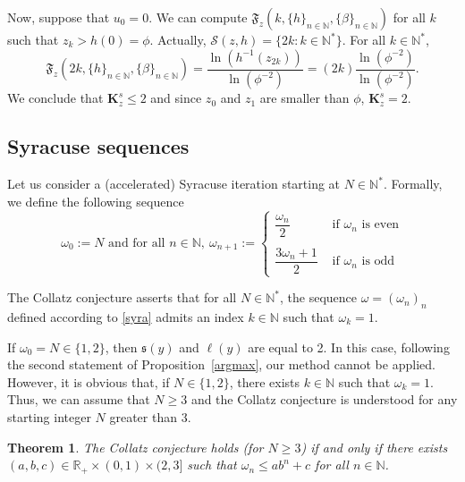 \documentclass{article}
\def\valu#1{\mathfrak{s}(#1)}
\def\ls#1{\boldsymbol{\ell}(#1)}
\def\rr{\mathbb R}
\def\nn{\mathbb N}
\def\bigks{\mathbf{K}^s}
\def\res{\mathcal{S}}
\newtheorem{theorem}{Theorem}
\def\red#1{#1}
\def\blue#1{#1}
\begin{document}
		Now, suppose that $u_0=0$. We can \blue{compute} $\mathfrak{F}_\blue{z}(k,\{h\}_{n\in\nn},\{\beta\}_{n\in\nn})$ for all $k$ such that $\blue{z}_k>h(0)=\phi$. Actually, $\res(\blue{z},h)=\{2k:k\in\nn^*\}$.
		For all $k\in\nn^*$, \[\mathfrak{F}_\blue{z}(2k,\{h\}_{n\in\nn},\{\beta\}_{n\in\nn})=\dfrac{\ln(h^{-1}(\blue{z}_{2k}))}{\ln(\phi^{-2})}=(2k)\dfrac{\ln(\phi^{-2})}{\ln(\phi^{-2})}.\] 
		We conclude that $\bigks_\blue{z}\leq 2$ and since $\blue{z}_0$ and $\blue{z}_1$ are smaller than $\phi$, $\bigks_\blue{z}=2$. 
		
		\subsection{Syracuse sequences}
		
		Let \red{us} consider a (accelerated) Syracuse iteration starting at $N\in \nn^*$. Formally, we define the following sequence
		\begin{equation}
			\label{syra}
			\blue{\omega}_0:=N\text{ and for all }n\in\nn,\ 
			\blue{\omega}_{n+1}:=\left\{ 
			\begin{array}{lr}
				\dfrac{\blue{\omega}_n}{2}& \text{ if } \blue{\omega}_n \text{ is even}\\
				\\
				\dfrac{3\blue{\omega}_n+1}{2}& \text{ if } \blue{\omega}_n \text{ is odd}
			\end{array}\right.
		\end{equation}
		
		The Collatz conjecture asserts that for all $N\in\nn^*$, the sequence $\blue{\omega}=(\blue{\omega}_n)_n$ defined according to \eqref{syra} admits an index $k\in\nn$ such that $\blue{\omega}_k=1$. 
		
		\blue{If $\omega_0=N\in\{1,2\}$, then $\valu{y}$ and $\ls{y}$ are equal to 2. In this case, following the second statement of Proposition~\ref{argmax}, our method cannot be applied. However, it is obvious that, if $N\in\{1,2\}$, there exists $k\in\nn$ such that $\omega_k=1$. Thus, we can assume that $N\geq 3$ and the Collatz conjecture is understood for any starting integer $N$ greater than 3.}   
		
		
		\begin{theorem}
			The Collatz conjecture holds \blue{(for $N\geq 3$)} if and only if there exists $(a,b,c)\in \rr_+\times (0,1)\times \blue{(2,3]}$ such that $\blue{\omega}_n\leq ab^n +c$ for all $n\in\nn$.  
		\end{theorem}
		
\end{document}
